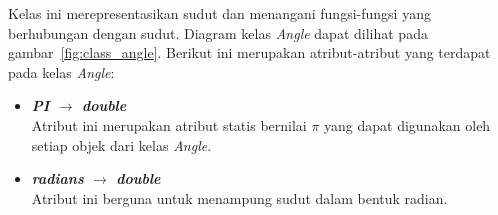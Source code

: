 Kelas ini merepresentasikan sudut dan menangani fungsi-fungsi yang berhubungan dengan sudut. Diagram kelas \textit{Angle} dapat dilihat pada gambar~\ref{fig:class_angle}. Berikut ini merupakan atribut-atribut yang terdapat pada kelas \textit{Angle}:
\begin{itemize}
	\item \textbf{\textit{PI} \(\rightarrow\) \textit{double}}\\
	Atribut ini merupakan atribut statis bernilai \(\pi\) yang dapat digunakan oleh setiap objek dari kelas \textit{Angle}.
	\item \textbf{\textit{radians} \(\rightarrow\) \textit{double}}\\
	Atribut ini berguna untuk menampung sudut dalam bentuk radian.
\end{itemize}

